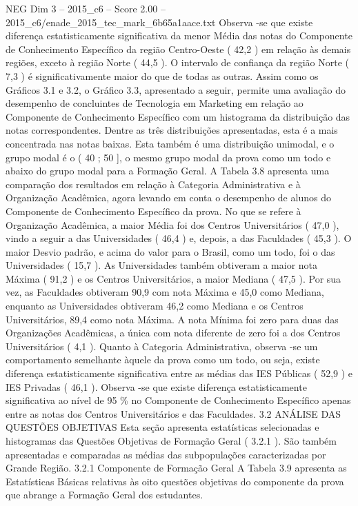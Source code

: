 \begin{textsample}{NEG Dim 3 – 2015\_c6 – Score 2.00 – 2015\_c6/enade\_2015\_tec\_mark\_6b65a1aace.txt}
Observa -se que existe diferença estatisticamente significativa da menor Média das notas do Componente de Conhecimento Específico da região Centro-Oeste ( 42,2 ) em relação às demais regiões, exceto à região Norte ( 44,5 ).
O intervalo de confiança da região Norte ( 7,3 ) é significativamente maior do que de todas as outras.
Assim como os Gráficos 3.1 e 3.2, o Gráfico 3.3, apresentado a seguir, permite uma avaliação do desempenho de concluintes de Tecnologia em Marketing em relação ao Componente de Conhecimento Específico com um histograma da distribuição das notas correspondentes.
Dentre as três distribuições apresentadas, esta é a mais concentrada nas notas baixas.
Esta também é uma distribuição unimodal, e o grupo modal é o ( 40 ; 50 ], o mesmo grupo modal da prova como um todo e abaixo do grupo modal para a Formação Geral.
A Tabela 3.8 apresenta uma comparação dos resultados em relação à Categoria Administrativa e à Organização Acadêmica, agora levando em conta o desempenho de alunos do Componente de Conhecimento Específico da prova.
No que se refere à Organização Acadêmica, a maior Média foi dos Centros Universitários ( 47,0 ), vindo a seguir a das Universidades ( 46,4 ) e, depois, a das Faculdades ( 45,3 ).
O maior Desvio padrão, e acima do valor para o Brasil, como um todo, foi o das Universidades ( 15,7 ).
As Universidades também obtiveram a maior nota Máxima ( 91,2 ) e os Centros Universitários, a maior Mediana ( 47,5 ).
Por sua vez, as Faculdades obtiveram 90,9 com nota Máxima e 45,0 como Mediana, enquanto as Universidades obtiveram 46,2 como Mediana e os Centros Universitários, 89,4 como nota Máxima.
A nota Mínima foi zero para duas das Organizações Acadêmicas, a única com nota diferente de zero foi a dos Centros Universitários ( 4,1 ).
Quanto à Categoria Administrativa, observa -se um comportamento semelhante àquele da prova como um todo, ou seja, existe diferença estatisticamente significativa entre as médias das IES Públicas ( 52,9 ) e IES Privadas ( 46,1 ).
Observa -se que existe diferença estatisticamente significativa ao nível de 95 \% no Componente de Conhecimento Específico apenas entre as notas dos Centros Universitários e das Faculdades. 3.2 ANÁLISE DAS QUESTÕES OBJETIVAS Esta seção apresenta estatísticas selecionadas e histogramas das Questões Objetivas de Formação Geral ( 3.2.1 ).
São também apresentadas e comparadas as médias das subpopulações caracterizadas por Grande Região. 3.2.1 Componente de Formação Geral A Tabela 3.9 apresenta as Estatísticas Básicas relativas às oito questões objetivas do componente da prova que abrange a Formação Geral dos estudantes.

\end{textsample}
